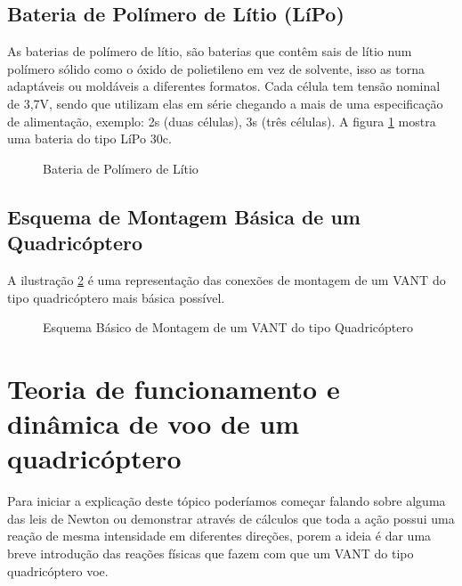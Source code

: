 \subsection{Bateria de Polímero de Lítio (LíPo)}
As baterias de polímero de lítio, são baterias que contêm sais de lítio num polímero sólido como o óxido de polietileno em vez de solvente, isso as torna adaptáveis ou moldáveis a diferentes formatos. Cada célula tem tensão nominal de 3,7V, sendo que utilizam elas em série chegando a mais de uma especificação de alimentação, exemplo: 2s (duas células), 3s (três células). A figura \ref{fig:bat} mostra uma bateria do tipo LíPo 30c.
\begin{figure}[H]
	\centering
	\caption{Bateria de Polímero de Lítio}
	\fontsize{9pt}{12pt}\selectfont
	\def\svgwidth{10cm}
	
	\label{fig:bat}
\end{figure}

\subsection{Esquema de Montagem Básica de um Quadricóptero}

A ilustração \ref{fig:esquemamont} é uma representação das conexões de montagem de um VANT do tipo quadricóptero mais básica possível.

\begin{figure}[H]
  \centering
  \caption{Esquema Básico de Montagem de um VANT do tipo Quadricóptero}
  \fontsize{9pt}{12pt}\selectfont
  \def\svgwidth{12cm}
  
  \label{fig:esquemamont}
\end{figure}
\section{Teoria de funcionamento e dinâmica de voo de um quadricóptero}

Para iniciar a explicação deste tópico poderíamos começar falando sobre alguma das leis de Newton ou demonstrar através de cálculos que toda a ação possui uma reação de mesma intensidade em diferentes direções, porem a ideia é dar uma breve introdução das reações físicas que fazem com que um VANT do tipo quadricóptero voe. 

